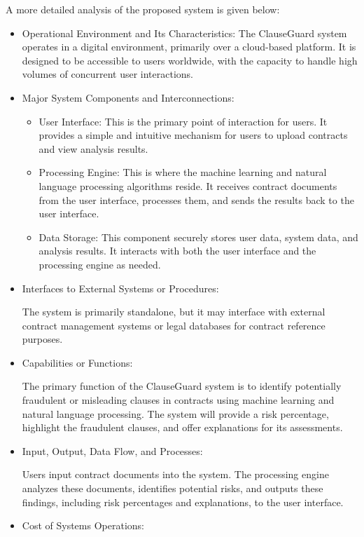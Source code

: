 A more detailed analysis of the proposed system is given below: 
\begin{itemize}
    \item Operational Environment and Its Characteristics: The ClauseGuard system operates in a digital environment, primarily over a cloud-based platform. It is designed to be accessible to users worldwide, with the capacity to handle high volumes of concurrent user interactions.
    \item  Major System Components and Interconnections:
    \begin{itemize}
        \item User Interface: This is the primary point of interaction for users. It provides a simple and intuitive mechanism for users to upload contracts and view analysis results.
        \item Processing Engine: This is where the machine learning and natural language processing algorithms reside. It receives contract documents from the user interface, processes them, and sends the results back to the user interface.
        \item Data Storage: This component securely stores user data, system data, and analysis results. It interacts with both the user interface and the processing engine as needed.
    \end{itemize}

\item Interfaces to External Systems or Procedures:

The system is primarily standalone, but it may interface with external contract management systems or legal databases for contract reference purposes.

\item   Capabilities or Functions:

The primary function of the ClauseGuard system is to identify potentially fraudulent or misleading clauses in contracts using machine learning and natural language processing. The system will provide a risk percentage, highlight the fraudulent clauses, and offer explanations for its assessments.
\item Input, Output, Data Flow, and Processes:

Users input contract documents into the system. The processing engine analyzes these documents, identifies potential risks, and outputs these findings, including risk percentages and explanations, to the user interface. 

\item Cost of Systems Operations:


\end{itemize}
